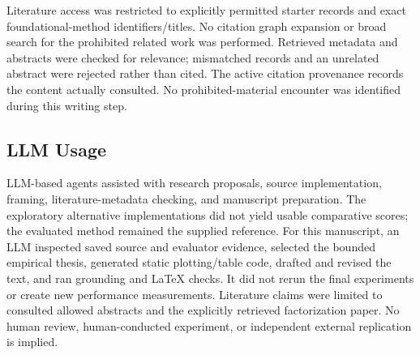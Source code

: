 \documentclass{article}
\begin{document}
Literature access was restricted to explicitly permitted starter records and exact foundational-method identifiers/titles. No citation graph expansion or broad search for the prohibited related work was performed. Retrieved metadata and abstracts were checked for relevance; mismatched records and an unrelated abstract were rejected rather than cited. The active citation provenance records the content actually consulted. No prohibited-material encounter was identified during this writing step.

\subsection{LLM Usage}
LLM-based agents assisted with research proposals, source implementation, framing, literature-metadata checking, and manuscript preparation. The exploratory alternative implementations did not yield usable comparative scores; the evaluated method remained the supplied reference. For this manuscript, an LLM inspected saved source and evaluator evidence, selected the bounded empirical thesis, generated static plotting/table code, drafted and revised the text, and ran grounding and LaTeX checks. It did not rerun the final experiments or create new performance measurements. Literature claims were limited to consulted allowed abstracts and the explicitly retrieved factorization paper. No human review, human-conducted experiment, or independent external replication is implied.
\end{document}
